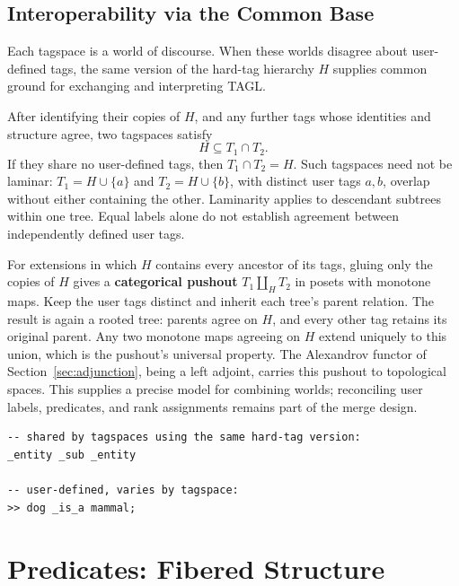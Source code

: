 \documentclass{article}
\begin{document}
\subsection{Interoperability via the Common Base}
\label{sec:common-ground}

Each tagspace is a world of discourse. When these worlds disagree about
user-defined tags, the same version of the hard-tag hierarchy $H$ supplies
common ground for exchanging and interpreting TAGL.

After identifying their copies of $H$, and any further tags whose identities
and structure agree, two tagspaces satisfy
\[
  H\subseteq T_1\cap T_2.
\]
If they share no user-defined tags, then $T_1\cap T_2=H$. Such tagspaces
need not be laminar: $T_1=H\cup\{a\}$ and $T_2=H\cup\{b\}$, with distinct
user tags $a,b$, overlap without either containing the other. Laminarity
applies to descendant subtrees within one tree. Equal labels alone do not
establish agreement between independently defined user tags.

For extensions in which $H$ contains every ancestor of its tags, gluing
only the copies of $H$ gives a \textbf{categorical pushout}
$T_1\amalg_H T_2$ in posets with monotone maps. Keep the user tags distinct
and inherit each tree's parent relation. The result is again a rooted tree:
parents agree on $H$, and every other tag retains its original parent.
Any two monotone maps agreeing on $H$ extend uniquely to this union,
which is the pushout's universal property. The Alexandrov functor of
Section~\ref{sec:adjunction}, being a left adjoint, carries this pushout to topological spaces.
This supplies a precise model for combining worlds; reconciling user labels,
predicates, and rank assignments remains part of the merge design.

\noindent\begin{minipage}{\linewidth}
\begin{lstlisting}[style=tagl, caption={A shared hard-tag version; distinct user extensions}]
-- shared by tagspaces using the same hard-tag version:
_entity _sub _entity

-- user-defined, varies by tagspace:
>> dog _is_a mammal;
\end{lstlisting}
\end{minipage}

\section{Predicates: Fibered Structure}
\end{document}
